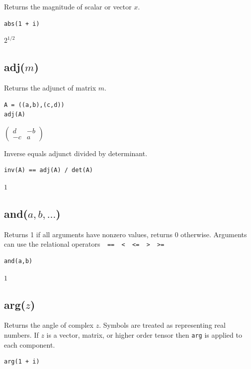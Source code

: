 \documentclass[12pt]{article}
\begin{document}
Returns the magnitude of scalar or vector $x$.

{\color{blue}
\begin{verbatim}
abs(1 + i)
\end{verbatim}
}

$2^{1/2}$

\subsection*{adj($m$)}

Returns the adjunct of matrix $m$.

{\color{blue}
\begin{verbatim}
A = ((a,b),(c,d))
adj(A)
\end{verbatim}
}

$
\begin{pmatrix}
d&-b
\\[1ex]
-c&a
\end{pmatrix}
$

\bigskip
Inverse equals adjunct divided by determinant.

{\color{blue}
\begin{verbatim}
inv(A) == adj(A) / det(A)
\end{verbatim}
}

$1$

\subsection*{and($a,b,\ldots$)}

Returns 1 if all arguments have nonzero values, returns 0 otherwise.
Arguments can use the relational operators\verb$  ==  <  <=  >  >=$

{\color{blue}
\begin{verbatim}
and(a,b)
\end{verbatim}
}

$1$

\subsection*{arg($z$)}

Returns the angle of complex $z$.
Symbols are treated as representing real numbers.
If $z$ is a vector, matrix, or higher order tensor then
\verb$arg$ is applied to each component.

{\color{blue}
\begin{verbatim}
arg(1 + i)
\end{verbatim}
}
\end{document}
